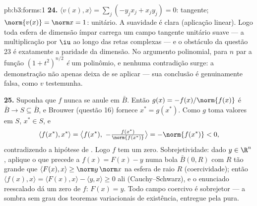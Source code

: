 \begin{solution}{pb:b3:forms:1}
\textbf{24.} $\langle v(x), x\rangle = \sum_j(-y_jx_j +
x_jy_j) = 0$: tangente; $\norm{v(x)} = \norm x = 1$: unitário.
A suavidade é clara (aplicação linear). Logo toda esfera de dimensão ímpar
carrega um campo tangente unitário suave --- a multiplicação
por $\iu$ ao longo das retas complexas --- e o obstáculo da questão 23
é exatamente a paridade da dimensão. No
argumento polinomial, para $n$ par a função $(1 +
t^2)^{n/2}$ \emph{é} um polinômio, e nenhuma contradição
surge: a demonstração não apenas deixa de se aplicar --- sua
conclusão é genuinamente falsa, como $v$ testemunha.

\textbf{25.} Suponha que $f$ nunca se anule em $\bar B$. Então
$g(x) = -f(x)/\norm{f(x)}$ é  $\bar B \to S
\subseteq \bar B$, e Brouwer (questão 16) fornece $x^* =
g(x^*)$. Como $g$ toma valores em $S$, $x^* \in S$, e
\[
\langle f(x^*), x^*\rangle = \bigl\langle f(x^*),\
-\tfrac{f(x^*)}{\norm{f(x^*)}}\bigr\rangle
= -\norm{f(x^*)} < 0,
\]
contradizendo a hipótese de . Logo $f$ tem um zero.
Sobrejetividade: dado $y \in \R^n$, aplique o que precede a $f(x) =
F(x) - y$ numa bola $\bar B(0, R)$ com $R$ tão grande que
$\langle F(x), x\rangle \geq \norm y\,\norm x$ na esfera
de raio $R$ (coercividade); então $\langle f(x), x\rangle =
\langle F(x), x\rangle - \langle y, x\rangle \geq 0$ ali
(Cauchy--Schwarz), e o enunciado reescalado dá um zero
de $f$: $F(x) = y$. Todo campo  coercivo é sobrejetor
--- a sombra sem grau dos teoremas variacionais de
existência, entregue pela  pura.
\end{solution}
